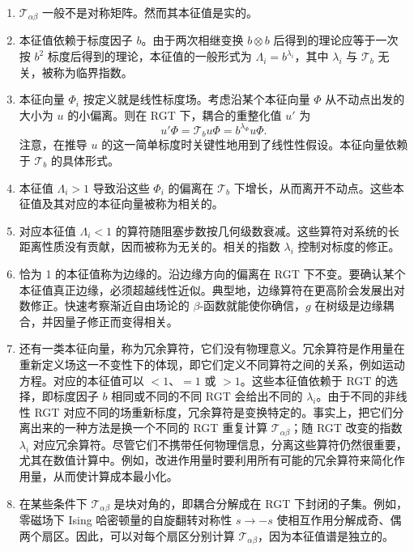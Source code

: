 \begin{enumerate}
\item $\mathcal{T}_{\alpha\beta}$ 一般不是对称矩阵。然而其本征值是实的。

\item 本征值依赖于标度因子 $b$。由于两次相继变换 $b \otimes b$ 后得到的理论应等于一次按 $b^2$ 标度后得到的理论，本征值的一般形式为 $\Lambda_i = b^{\lambda_i}$，其中 $\lambda_i$ 与 $\mathcal{T}_b$ 无关，被称为临界指数。

\item 本征向量 $\Phi_i$ 按定义就是线性标度场。考虑沿某个本征向量 $\Phi$ 从不动点出发的大小为 $u$ 的小偏离。则在 RGT 下，耦合的重整化值 $u'$ 为
  \begin{equation}
  u'\Phi = \mathcal{T}_b u\Phi = b^{\lambda_\Phi}u\Phi.
  \label{eq:ltmd}
  \end{equation}
  注意，在推导 $u$ 的这一简单标度时关键性地用到了线性性假设。本征向量依赖于 $\mathcal{T}_b$ 的具体形式。

\item 本征值 $\Lambda_i > 1$ 导致沿这些 $\Phi_i$ 的偏离在 $\mathcal{T}_b$ 下增长，从而离开不动点。这些本征值及其对应的本征向量被称为相关的。

\item 对应本征值 $\Lambda_i < 1$ 的算符随阻塞步数按几何级数衰减。这些算符对系统的长距离性质没有贡献，因而被称为无关的。相关的指数 $\lambda_i$ 控制对标度的修正。

\item 恰为 1 的本征值称为边缘的。沿边缘方向的偏离在 RGT 下不变。要确认某个本征值真正边缘，必须超越线性近似。典型地，边缘算符在更高阶会发展出对数修正。快速考察渐近自由场论的
$\beta$-函数就能使你确信，$g$ 在树级是边缘耦合，并因量子修正而变得相关。

\item 还有一类本征向量，称为冗余算符，它们没有物理意义。冗余算符是作用量在重新定义场这一不变性下的体现，即它们定义不同算符之间的关系，例如运动方程。对应的本征值可以 $<1$、$=1$ 或 $>1$。这些本征值依赖于 RGT 的选择，即标度因子 $b$ 相同或不同的不同 RGT 会给出不同的 $\lambda_i$。由于不同的非线性 RGT 对应不同的场重新标度，冗余算符是变换特定的。事实上，把它们分离出来的一种方法是换一个不同的 RGT 重复计算 $\mathcal{T}_{\alpha\beta}$；随 RGT 改变的指数 $\lambda_i$ 对应冗余算符。尽管它们不携带任何物理信息，分离这些算符仍然很重要，尤其在数值计算中。例如，改进作用量时要利用所有可能的冗余算符来简化作用量，从而使计算成本最小化。

\item 在某些条件下 $\mathcal{T}_{\alpha\beta}$ 是块对角的，即耦合分解成在 RGT 下封闭的子集。例如，零磁场下 Ising 哈密顿量的自旋翻转对称性 $s \to -s$ 使相互作用分解成奇、偶两个扇区。因此，可以对每个扇区分别计算 $\mathcal{T}_{\alpha\beta}$，因为本征值谱是独立的。
\end{enumerate}

